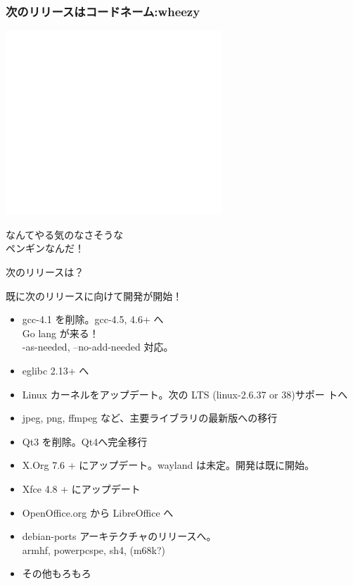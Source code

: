 \begin{frame}
 \frametitle{次のリリースはコードネーム:wheezy}
\begin{center}
\includegraphics[width=0.8\vsize]{image201103/toystory_wheezy.jpg}
\end{center}
\pause

\begin{center}
\Large  \color{red}なんてやる気のなさそうな\\ペンギンなんだ！
\end{center}
\end{frame}

\begin{frame}{次のリリースは？}

既に次のリリースに向けて開発が開始！
\begin{itemize}[<+->]
 \item gcc-4.1 を削除。gcc-4.5, 4.6+ へ\\
Go lang が来る！\\
-as-needed, --no-add-needed 対応。\\
 \item eglibc 2.13+ へ
 \item Linux カーネルをアップデート。次の LTS (linux-2.6.37 or 38)サポー
       トへ
 \item jpeg, png, ffmpeg など、主要ライブラリの最新版への移行
 \item Qt3 を削除。Qt4へ完全移行
 \item X.Org 7.6 + にアップデート。wayland は未定。開発は既に開始。
 \item Xfce 4.8 + にアップデート 
 \item OpenOffice.org から LibreOffice へ
 \item debian-ports アーキテクチャのリリースへ。\\
       armhf, powerpcspe, sh4, (m68k?)
 \item その他もろもろ
 \end{itemize}
\end{frame}

